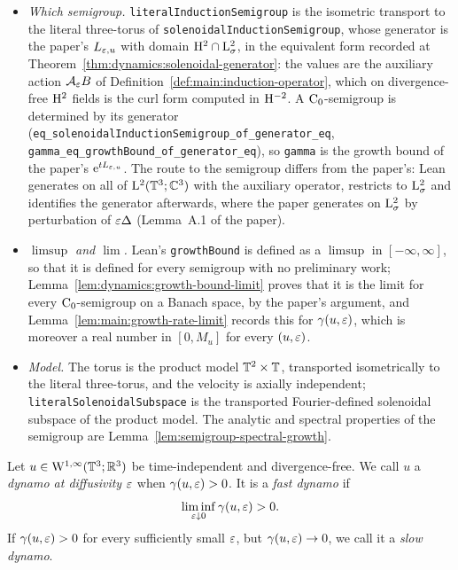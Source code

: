 \begin{itemize}
  \item \emph{Which semigroup.}  \texttt{literalInductionSemigroup} is the isometric transport
    to the literal three-torus of \texttt{solenoidalInductionSemigroup}, whose generator is the
    paper's $L_{\varepsilon,u}$ with domain $\mathrm{H}^2\cap\mathrm{L}^2_\sigma$, in the equivalent form recorded at
    Theorem~\ref{thm:dynamics:solenoidal-generator}: the values are the auxiliary action
    $\mathcal A_\varepsilon B$ of Definition~\ref{def:main:induction-operator}, which on
    divergence-free $\mathrm{H}^2$ fields is the curl form computed in $\mathrm{H}^{-2}$.  A
    $\mathrm{C}_0$-semigroup is determined by its generator
    (\texttt{eq\_solenoidalInductionSemigroup\_of\_generator\_eq},
    \texttt{gamma\_eq\_growthBound\_of\_generator\_eq}), so \texttt{gamma} is the growth bound
    of the paper's $\mathrm{e}^{tL_{\varepsilon,u}}$.  The route to the semigroup differs from the paper's:
    Lean generates on all of $\mathrm{L}^2(\mathbb{T}^3;\mathbb{C}^3)$ with the auxiliary operator, restricts to
    $\mathrm{L}^2_\sigma$ and identifies the generator afterwards, where the paper generates on
    $\mathrm{L}^2_\sigma$ by perturbation of $\varepsilon\Delta$ (Lemma~A.1 of the paper).
  \item \emph{$\limsup$ and $\lim$.}  Lean's \texttt{growthBound} is defined as a
    $\limsup$ in $[-\infty,\infty]$, so that it is defined for every semigroup with no
    preliminary work; Lemma~\ref{lem:dynamics:growth-bound-limit} proves that it is the limit
    for every $\mathrm{C}_0$-semigroup on a Banach space, by the paper's argument, and
    Lemma~\ref{lem:main:growth-rate-limit} records this for $\gamma(u,\varepsilon)$, which is
    moreover a real number in $[0,M_u]$ for every $(u,\varepsilon)$.
  \item \emph{Model.}  The torus is the product model $\mathbb{T}^2\times\mathbb{T}$, transported
    isometrically to the literal three-torus, and the velocity is axially independent;
    \texttt{literalSolenoidalSubspace} is the transported Fourier-defined solenoidal subspace
    of the product model.  The analytic and spectral properties of the semigroup are
    Lemma~\ref{lem:semigroup-spectral-growth}.
\end{itemize}

\begin{definition}
  \label{def:main:dynamo}
  \leanok
  Let $u\in\mathrm{W}^{1,\infty}(\mathbb{T}^3;\mathbb{R}^3)$ be time-independent and divergence-free.  We call $u$ a
  \emph{dynamo at diffusivity $\varepsilon$} when $\gamma(u,\varepsilon)>0$.  It is a \emph{fast dynamo} if
  \[
    \liminf_{\varepsilon\downarrow0}\gamma(u,\varepsilon)>0.
  \]
  If $\gamma(u,\varepsilon)>0$ for every sufficiently small $\varepsilon$, but $\gamma(u,\varepsilon)\to0$, we call
  it a \emph{slow dynamo}.
\end{definition}

